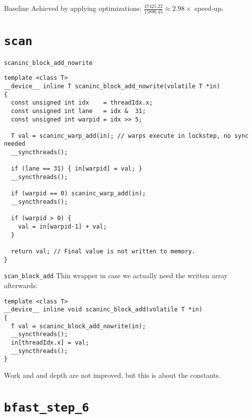 \begin{frame}[fragile]{Baseline}
\pause
Achieved by applying optimizations:
\(\frac{47425.22}{15896.45} \approx 2.98 \times \) speed-up.



\end{frame}



\section{\texttt{scan}} 

\begin{frame}[fragile]{\texttt{scaninc\_block\_add\_nowrite}}
\begin{verbatim}
template <class T>
__device__ inline T scaninc_block_add_nowrite(volatile T *in)
{
  const unsigned int idx    = threadIdx.x;
  const unsigned int lane   = idx &  31;
  const unsigned int warpid = idx >> 5;

  T val = scaninc_warp_add(in); // warps execute in lockstep, no sync needed
  __syncthreads();

  if (lane == 31) { in[warpid] = val; }
  __syncthreads();

  if (warpid == 0) scaninc_warp_add(in);
  __syncthreads();

  if (warpid > 0) {
    val = in[warpid-1] + val;
  }

  return val; // Final value is not written to memory.
}
\end{verbatim}
\end{frame}

\begin{frame}[fragile]{\texttt{scan\_block\_add}}
    Thin wrapper in case we actually need the written array afterwards:
\begin{verbatim}
template <class T>
__device__ inline void scaninc_block_add(volatile T *in)
{
  T val = scaninc_block_add_nowrite(in);
  __syncthreads();
  in[threadIdx.x] = val;
  __syncthreads();
}
\end{verbatim}

\pause Work and and depth are not improved, but this is about the constants.

\end{frame}


\section{\texttt{bfast\_step\_6}} 


